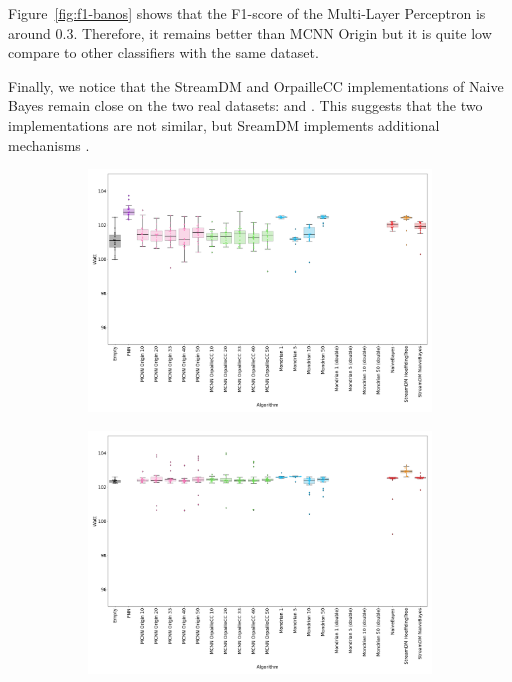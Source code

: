 Figure~\ref{fig:f1-banos} shows that the F1-score of the Multi-Layer Perceptron
is around 0.3. Therefore, it remains better than MCNN Origin but it is quite
low compare to other classifiers with the same dataset.

Finally, we notice that the StreamDM and OrpailleCC implementations of Naive
Bayes remain close on the two real datasets: \banosdataset and \recofitdataset.
This suggests that the two implementations are not similar, but SreamDM
implements additional mechanisms .



\begin{figure}
	\begin{subfigure}[t]{.49\linewidth}
		\includegraphics[width=\linewidth]{figures/results/banos_3_watt.png}
		\caption{\banosdataset}
		\label{fig:power-banos}
	\end{subfigure}
	\hfill
	\begin{subfigure}[t]{.49\linewidth}
		\includegraphics[width=\linewidth]{figures/results/recofit_3_watt.png}

\end{subfigure}
\end{figure}
